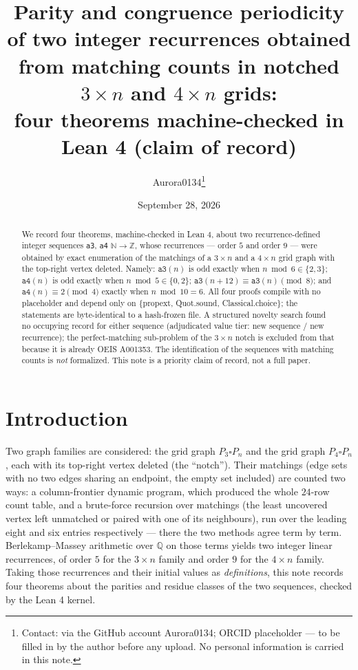 \documentclass[11pt]{article}
\title{Parity and congruence periodicity of two integer recurrences obtained from
matching counts in notched $3 \times n$ and $4 \times n$ grids:\\
four theorems machine-checked in Lean 4 (claim of record)}
\author{Aurora0134\thanks{Contact: via the GitHub account Aurora0134; ORCID
placeholder --- to be filled in by the author before any upload. No personal
information is carried in this note.}}
\date{September 28, 2026}
\begin{document}
\maketitle

\begin{abstract}
We record four theorems, machine-checked in Lean 4, about two recurrence-defined
integer sequences \texttt{a3}, \texttt{a4} $\mathbb{N} \to \mathbb{Z}$, whose
recurrences --- order $5$ and order $9$ --- were obtained by exact enumeration of
the matchings of a $3 \times n$ and a $4 \times n$ grid graph with the top-right
vertex deleted. Namely: $\texttt{a3}(n)$ is odd exactly when $n \bmod 6 \in
\{2,3\}$; $\texttt{a4}(n)$ is odd exactly when $n \bmod 5 \in \{0,2\}$;
$\texttt{a3}(n+12) \equiv \texttt{a3}(n) \pmod 8$; and $\texttt{a4}(n) \equiv 2
\pmod 4$ exactly when $n \bmod 10 = 6$. All four proofs compile with no
placeholder and depend only on \{propext, Quot.sound, Classical.choice\}; the
statements are byte-identical to a hash-frozen file. A structured novelty search
found no occupying record for either sequence (adjudicated value tier: new
sequence / new recurrence); the perfect-matching sub-problem of the $3 \times n$
notch is excluded from that because it is already OEIS A001353. The
identification of the sequences with matching counts is \emph{not} formalized.
This note is a priority claim of record, not a full paper.
\end{abstract}

\section{Introduction}

Two graph families are considered: the grid graph $P_3 \square P_n$ and the grid
graph $P_4 \square P_n$, each with its top-right vertex deleted (the ``notch'').
Their matchings (edge sets with no two edges sharing an endpoint, the empty set
included) are counted two ways: a column-frontier dynamic program, which produced
the whole $24$-row count table, and a brute-force recursion over matchings (the
least uncovered vertex left unmatched or paired with one of its neighbours), run
over the leading eight and six entries respectively --- there the two methods agree
term by term. Berlekamp--Massey arithmetic over $\mathbb{Q}$ on those terms yields
two integer linear recurrences, of order $5$ for the $3 \times n$ family and
order $9$ for the $4 \times n$ family. Taking those recurrences and their initial
values as \emph{definitions}, this note records four theorems about the parities
and residue classes of the two sequences, checked by the Lean 4 kernel.
\end{document}
